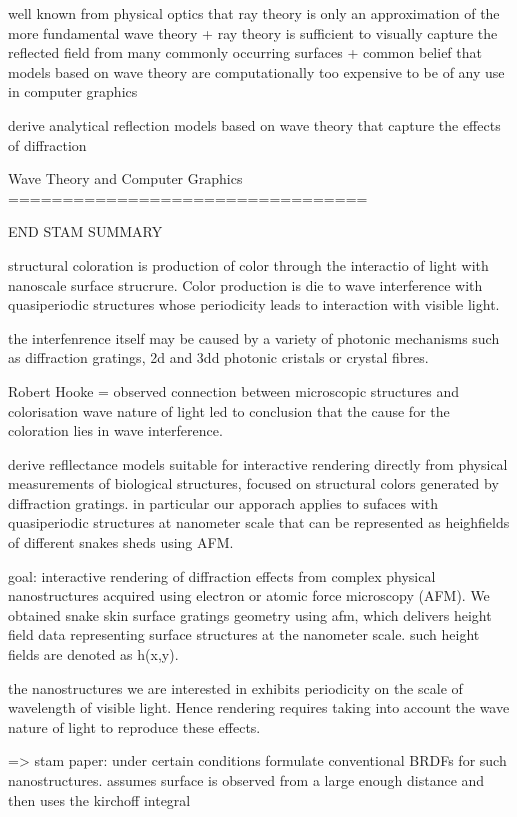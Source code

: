well known from physical optics that ray theory is only an approximation of the more fundamental wave theory
+ ray theory is sufficient to visually capture the reflected field from many commonly occurring surfaces
+ common belief that models based on wave theory are computationally too expensive to be of any use in computer graphics

derive analytical reflection models based on wave theory that capture the effects of diffraction


Wave Theory and Computer Graphics
=================================

END STAM SUMMARY


structural coloration is production of color through the interactio of light with nanoscale surface strucrure. Color production is die to wave interference with quasiperiodic structures whose periodicity leads to interaction with visible light.

the interfenrence itself may be  caused by a variety of photonic mechanisms such as diffraction gratings, 2d and 3dd photonic cristals or crystal fibres.


Robert Hooke = observed connection between microscopic structures and colorisation
wave nature of light led to conclusion that the cause for the coloration lies in wave interference.

derive refllectance models suitable for interactive rendering directly from physical measurements of biological structures, focused on structural colors generated by diffraction gratings. in particular our apporach applies to sufaces with quasiperiodic structures at nanometer scale that can be represented as heighfields of different snakes sheds using AFM.

goal: interactive rendering of diffraction effects from complex physical nanostructures acquired using electron or atomic force microscopy (AFM). We obtained snake skin surface gratings geometry using afm, which delivers height field data representing surface structures at the nanometer scale. such height fields are denoted as h(x,y).

the nanostructures we are interested in exhibits periodicity on the scale of wavelength of visible light. Hence rendering requires taking into account the wave nature of light to reproduce these effects.

=> stam paper:
under certain conditions formulate conventional BRDFs for such nanostructures. assumes surface is observed from a large enough distance and then uses the kirchoff integral 

